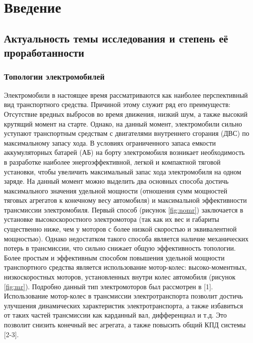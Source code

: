 \chapter{Введение} \label{ch:ch1}

\section{Актуальность темы исследования и степень её проработанности} \label{sec:ch1/sec1}
\subsection{Топологии электромобилей}

Электромобили в настоящее время рассматриваются как наиболее перспективный вид транспортного средства. Причиной этому служит ряд его преимуществ: Отсутствие вредных выбросов во время движения, низкий шум, а также высокий крутящий момент на старте. Однако, на данный момент, электромобили сильно уступают транспортным средствам с двигателями внутреннего сгорания (ДВС) по максимальному запасу хода. В условиях ограниченного запаса емкости аккумуляторных батарей (АБ) на борту электромобиля возникает необходимость в разработке наиболее энергоэффективной, легкой и компактной тяговой установки, чтобы увеличить максимальный запас хода электромобиля на одном заряде. 
На данный момент можно выделить два основных способа достичь максимального значения удельной мощности (отношения сумм мощностей тяговых агрегатов к конечному весу автомобиля) и максимальной эффективности трансмиссии электромобиля. Первый способ (рисунок \ref{fig:nomr}) заключается в установке высокоскоростного электромотора (так как их вес и габариты существенно ниже, чем у моторов с более низкой скоростью и эквивалентной мощностью). Однако недостатком такого способа является наличие механических потерь в трансмиссии, что сильно снижает общую эффективность топологии.
Более простым и эффективным способом повышения удельной мощности транспортного средства является использование мотор-колес: высоко-моментных, низкоскоростных моторов, установленных внутри колес автомобиля (рисунок \ref{fig:mr}). Подробно данный тип электромоторов был рассмотрен в [1]. Использование мотор-колес в трансмиссии электротранспорта позволит достичь улучшения динамических характеристик электротранспорта, а также избавиться от таких частей трансмиссии как карданный вал, дифференциал и т.д. Это позволит снизить конечный вес агрегата, а также повысить общий КПД системы [2-3].

